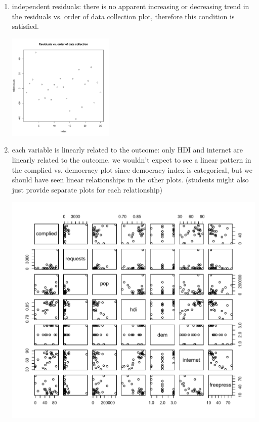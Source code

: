 \documentclass[11pt]{article}
\begin{document}
\begin{enumerate}
{\begin{enumerate}[1.]
\begin{center}
\end{center}
\item independent residuals: there is no apparent increasing or decreasing trend in the residuals vs. order of data collection plot, therefore this condition is satisfied.
\begin{center}
\includegraphics[width=0.4\textwidth]{figures/res_order}
\end{center}
\item each variable is linearly related to the outcome: only HDI and internet are linearly related to the outcome. we wouldn't expect to see a linear pattern in the complied vs. democracy plot since democracy index is categorical, but we should have seen linear relationships in the other plots. (students might also just provide separate plots for each relationship)
\begin{center}
\includegraphics[width=\textwidth]{figures/pairwise}
\end{center}
\end{enumerate}
}


\end{enumerate}
\end{document}
